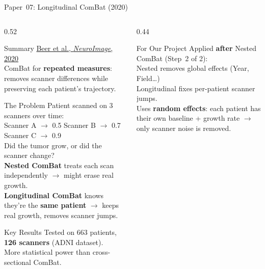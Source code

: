 \documentclass[aspectratio=169,xcolor=dvipsnames]{beamer}
\begin{document}
\begin{frame}{Paper~07: Longitudinal ComBat (2020)}
    \begin{columns}
        \begin{column}{0.52\textwidth}
            \begin{block}{Summary}
                \small
                \href{https://doi.org/10.1016/j.neuroimage.2020.117129}{Beer et al., \textit{NeuroImage}, 2020}\\[0.3em]
                ComBat for \textbf{repeated measures}: removes scanner differences while preserving each patient's trajectory.
            \end{block}

            \vspace{0.2em}

            \begin{block}{\small The Problem}
                \scriptsize
                Patient scanned on 3 scanners over time:\\[0.1em]
                \quad Scanner A $\to$ 0.5 \quad Scanner B $\to$ 0.7 \quad Scanner C $\to$ 0.9\\[0.2em]
                Did the tumor grow, or did the scanner change?\\[0.2em]
                \textbf{Nested ComBat} treats each scan independently $\to$ might erase real growth.\\[0.2em]
                \textbf{Longitudinal ComBat} knows they're the \textbf{same patient} $\to$ keeps real growth, removes scanner jumps.
            \end{block}

            \vspace{0.2em}

            \begin{block}{\scriptsize Key Results}
                \scriptsize
                Tested on 663 patients, \textbf{126 scanners} (ADNI dataset).\\[0.1em]
                More statistical power than cross-sectional ComBat.
            \end{block}
        \end{column}

        \begin{column}{0.44\textwidth}
            \begin{alertblock}{For Our Project}
                \scriptsize
                Applied \textbf{after} Nested ComBat (Step~2 of 2):\\[0.2em]
                Nested removes global effects (Year, Field\ldots)\\[0.1em]
                Longitudinal fixes per-patient scanner jumps.\\[0.2em]
                Uses \textbf{random effects}: each patient has their own baseline + growth rate $\to$ only scanner noise is removed.
            \end{alertblock}


\end{column}
\end{columns}
\end{frame}
\end{document}
